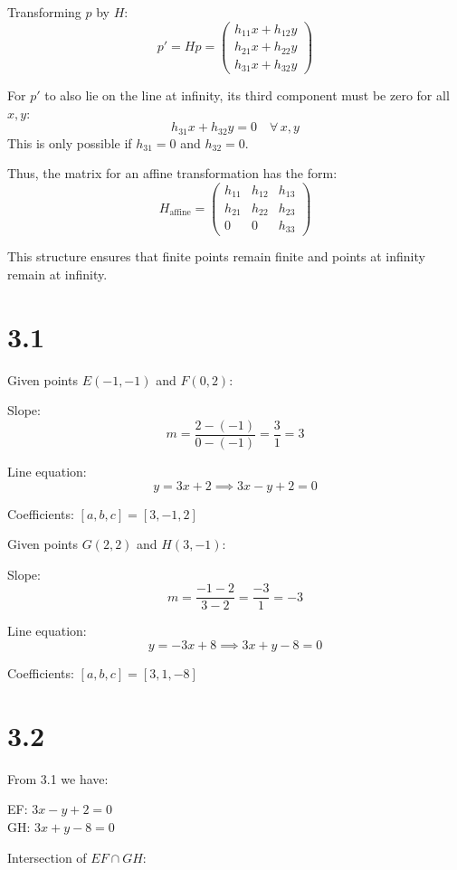 \documentclass[12pt]{article}
\begin{document}
    Transforming $p$ by $H$:
    \[
    p' = H p = \begin{pmatrix}
    h_{11}x + h_{12}y \\
    h_{21}x + h_{22}y \\
    h_{31}x + h_{32}y
    \end{pmatrix}
    \]

    For $p'$ to also lie on the line at infinity, its third component must be zero for all $x, y$:
    \[
    h_{31}x + h_{32}y = 0 \quad \forall\, x, y
    \]
    This is only possible if $h_{31} = 0$ and $h_{32} = 0$.

    Thus, the matrix for an affine transformation has the form:
    \[
    H_{\text{affine}} = \begin{pmatrix}
    h_{11} & h_{12} & h_{13} \\
    h_{21} & h_{22} & h_{23} \\
    0      & 0      & h_{33}
    \end{pmatrix}
    \]

    This structure ensures that finite points remain finite and points at infinity remain at infinity.

    \section*{3.1}
    Given points $E(-1, -1)$ and $F(0, 2)$:

    Slope:
    \[
    m = \frac{2 - (-1)}{0 - (-1)} = \frac{3}{1} = 3
    \]

    Line equation:
    \[
    y = 3x + 2 \implies 3x - y + 2 = 0
    \]

    Coefficients: $[a, b, c] = [3, -1, 2]$

    Given points $G(2, 2)$ and $H(3, -1)$:

    Slope:
    \[
    m = \frac{-1 - 2}{3 - 2} = \frac{-3}{1} = -3
    \]

    Line equation:
    \[
    y = -3x + 8 \implies 3x + y - 8 = 0
    \]

    Coefficients: $[a, b, c] = [3, 1, -8]$

    \section*{3.2}
    From 3.1 we have:

    EF: $3x - y + 2 = 0$ \\
    GH: $3x + y - 8 = 0$

    Intersection of $EF \cap GH$:
\end{document}

